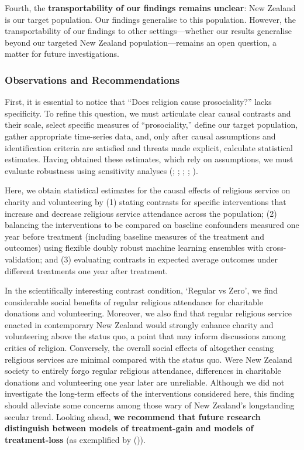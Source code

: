 \documentclass[
  single column]{article}
\begin{document}
Fourth, the \textbf{transportability of our findings remains unclear}:
New Zealand is our target population. Our findings generalise to this
population. However, the transportability of our findings to other
settings---whether our results generalise beyond our targeted New
Zealand population---remains an open question, a matter for future
investigations.

\subsubsection{Observations and
Recommendations}\label{observations-and-recommendations}

First, it is essential to notice that ``Does religion cause
prosociality?'' lacks specificity. To refine this question, we must
articulate clear causal contrasts and their scale, select specific
measures of ``prosociality,'' define our target population, gather
appropriate time-series data, and, only after causal assumptions and
identification criteria are satisfied and threats made explicit,
calculate statistical estimates. Having obtained these estimates, which
rely on assumptions, we must evaluate robustness using sensitivity
analyses (;
;
;
;
).

Here, we obtain statistical estimates for the causal effects of
religious service on charity and volunteering by (1) stating contrasts
for specific interventions that increase and decrease religious service
attendance across the population; (2) balancing the interventions to be
compared on baseline confounders measured one year before treatment
(including baseline measures of the treatment and outcomes) using
flexible doubly robust machine learning ensembles with cross-validation;
and (3) evaluating contrasts in expected average outcomes under
different treatments one year after treatment.

In the scientifically interesting contrast condition, `Regular vs Zero',
we find considerable social benefits of regular religious attendance for
charitable donations and volunteering. Moreover, we also find that
regular religious service enacted in contemporary New Zealand would
strongly enhance charity and volunteering above the status quo, a point
that may inform discussions among critics of religion. Conversely, the
overall social effects of altogether ceasing religious services are
minimal compared with the status quo. Were New Zealand society to
entirely forgo regular religious attendance, differences in charitable
donations and volunteering one year later are unreliable. Although we
did not investigate the long-term effects of the interventions
considered here, this finding should alleviate some concerns among those
wary of New Zealand's longstanding secular trend. Looking ahead,
\textbf{we recommend that future research distinguish between models of
treatment-gain and models of treatment-loss} (as exemplified by
()).
\end{document}
